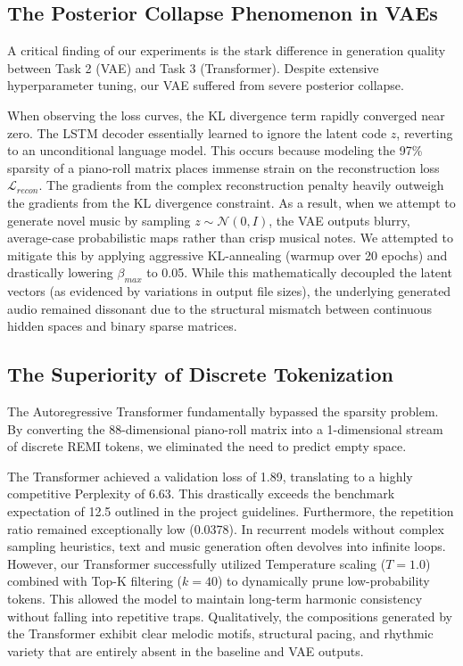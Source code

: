 \documentclass[conference]{IEEEtran}
\begin{document}
\subsection{The Posterior Collapse Phenomenon in VAEs}
A critical finding of our experiments is the stark difference in generation quality between Task 2 (VAE) and Task 3 (Transformer). Despite extensive hyperparameter tuning, our VAE suffered from severe posterior collapse. 

When observing the loss curves, the KL divergence term rapidly converged near zero. The LSTM decoder essentially learned to ignore the latent code $z$, reverting to an unconditional language model. This occurs because modeling the 97\% sparsity of a piano-roll matrix places immense strain on the reconstruction loss $\mathcal{L}_{recon}$. The gradients from the complex reconstruction penalty heavily outweigh the gradients from the KL divergence constraint. As a result, when we attempt to generate novel music by sampling $z \sim \mathcal{N}(0, I)$, the VAE outputs blurry, average-case probabilistic maps rather than crisp musical notes. We attempted to mitigate this by applying aggressive KL-annealing (warmup over 20 epochs) and drastically lowering $\beta_{max}$ to 0.05. While this mathematically decoupled the latent vectors (as evidenced by variations in output file sizes), the underlying generated audio remained dissonant due to the structural mismatch between continuous hidden spaces and binary sparse matrices.

\subsection{The Superiority of Discrete Tokenization}
The Autoregressive Transformer fundamentally bypassed the sparsity problem. By converting the 88-dimensional piano-roll matrix into a 1-dimensional stream of discrete REMI tokens, we eliminated the need to predict empty space.

The Transformer achieved a validation loss of 1.89, translating to a highly competitive Perplexity of 6.63. This drastically exceeds the benchmark expectation of 12.5 outlined in the project guidelines. Furthermore, the repetition ratio remained exceptionally low (0.0378). In recurrent models without complex sampling heuristics, text and music generation often devolves into infinite loops. However, our Transformer successfully utilized Temperature scaling ($T=1.0$) combined with Top-K filtering ($k=40$) to dynamically prune low-probability tokens. This allowed the model to maintain long-term harmonic consistency without falling into repetitive traps. Qualitatively, the compositions generated by the Transformer exhibit clear melodic motifs, structural pacing, and rhythmic variety that are entirely absent in the baseline and VAE outputs.
\end{document}
